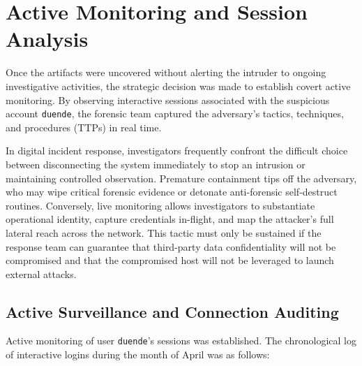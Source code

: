 \chapter{Active Monitoring and Session Analysis}

Once the artifacts were uncovered without alerting the intruder to ongoing investigative activities, the strategic decision was made to establish covert active monitoring. By observing interactive sessions associated with the suspicious account \texttt{duende}, the forensic team captured the adversary's tactics, techniques, and procedures (TTPs) in real time.

\begin{notaforense}
In digital incident response, investigators frequently confront the difficult choice between disconnecting the system immediately to stop an intrusion or maintaining controlled observation. Premature containment tips off the adversary, who may wipe critical forensic evidence or detonate anti-forensic self-destruct routines. Conversely, live monitoring allows investigators to substantiate operational identity, capture credentials in-flight, and map the attacker's full lateral reach across the network. This tactic must only be sustained if the response team can guarantee that third-party data confidentiality will not be compromised and that the compromised host will not be leveraged to launch external attacks.
\end{notaforense}

\section{Active Surveillance and Connection Auditing}

Active monitoring of user \texttt{duende}'s sessions was established. The chronological log of interactive logins during the month of April was as follows:

\vspace{1em}

